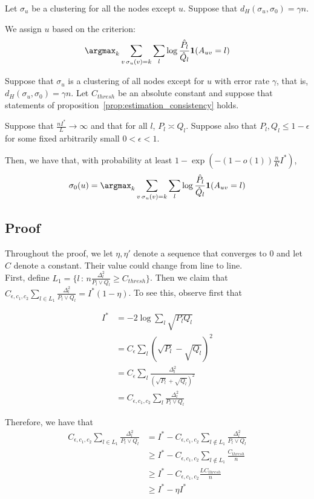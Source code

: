 \documentclass{article}
\begin{document}
Let $\sigma_u$ be a clustering for all the nodes except $u$. Suppose that $d_H(\sigma_u, \sigma_0) = \gamma n$. 


We assign $u$ based on the criterion:
\[
\argmax_k \sum_{v\, \sigma_u(v)=k} \sum_l \log \frac{\hat{P}_l}{\hat{Q}_l} \mathbf{1}(A_{uv} = l) 
\]

\begin{proposition}
Suppose that $\sigma_u$ is a clustering of all nodes except for $u$ with error rate $\gamma$, that is, $d_H(\sigma_u, \sigma_0) = \gamma n$. Let $C_{thresh}$ be an absolute constant and suppose that statements of proposition~\ref{prop:estimation_consistency} holds. 

Suppose that $\frac{n I^*}{L} \rightarrow \infty$ and that for all $l$, $P_l \asymp Q_l$.  Suppose also that $P_l, Q_l \leq 1 - \epsilon$ for some fixed arbitrarily small $0 < \epsilon < 1$. 

Then, we have that, with probability at least $1 - \exp \left( - (1 - o(1)) \frac{n}{K} I^* \right)$, 
\[
\sigma_0(u) = \argmax_k \sum_{v\, \sigma_u(v)=k} \sum_l \log \frac{\hat{P}_l}{\hat{Q}_l} \mathbf{1}(A_{uv} = l) 
\]

\end{proposition}




\subsection{Proof}

Throughout the proof, we let $\eta, \eta'$ denote a sequence that converges to 0 and let $C$ denote a constant. Their value could change from line to line. \\

First, define $L_1 = \{ l \,:\, n \frac{\Delta_l^2}{P_l \vee Q_l} \geq C_{thresh} \}$. Then we claim that $C_{\epsilon, c_1, c_2} \sum_{l \in L_1} \frac{\Delta_l^2}{P_l \vee Q_l} = I^*( 1 - \eta )$. To see this, observe first that

\begin{align*}
I^* &= -2 \log \sum_l \sqrt{P_l Q_l} \\
  &= C_\epsilon \sum_l (\sqrt{P_l} - \sqrt{Q_l} )^2 \\
  &= C_\epsilon \sum_l \frac{\Delta_l^2}{(\sqrt{P_l} + \sqrt{Q_l})^2} \\
  &= C_{\epsilon, c_1, c_2} \sum_l \frac{\Delta_l^2}{P_l \vee Q_l} 
\end{align*}

Therefore, we have that
\begin{align*}
C_{\epsilon, c_1, c_2} \sum_{l \in L_1} \frac{\Delta_l^2}{P_l \vee Q_l} &= I^* - 
 C_{\epsilon, c_1, c_2} \sum_{l \notin L_1} \frac{\Delta_l^2}{P_l \vee Q_l} \\
 &\geq I^* - C_{\epsilon, c_1, c_2} \sum_{l \notin L_1} \frac{C_{thresh}}{n} \\
 &\geq I^* - C_{\epsilon, c_1, c_2} \frac{ L C_{thresh}}{n} \\
 &\geq I^* - \eta I^* 
\end{align*}
\end{document}
